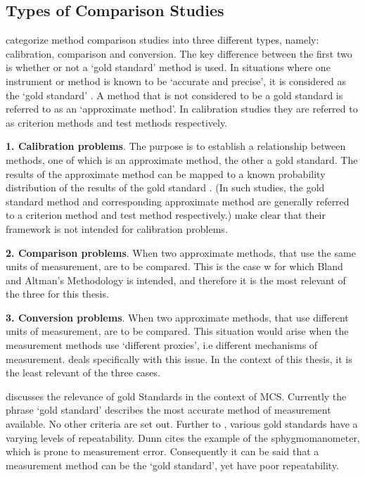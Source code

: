 \documentclass[12pt, a4paper]{report}
\theoremstyle{plain}
\theoremstyle{definition}
\theoremstyle{remark}
\begin{document}
	
	
	
	
	
	
	
	
	
	
	
	\subsection{Types of Comparison Studies}
	\citet{lewis1991} categorize method comparison studies into three
	different types, namely: calibration, comparison and conversion. The key difference between the first two is
	whether or not a `gold standard' method is used. In situations
	where one instrument or method is known to be `accurate and
	precise', it is considered as the `gold standard' \citep{lewis1991}. A
	method that is not considered to be a gold standard is referred to
	as an `approximate method'. In calibration studies they are
	referred to as criterion methods and test methods respectively.
	
	
	\textbf{1. Calibration problems}. The purpose is to establish a
	relationship between methods, one of which is an approximate
	method, the other a gold standard. The results of the approximate
	method can be mapped to a known probability distribution of the
	results of the gold standard \citep{lewis1991}. (In such studies, the
	gold standard method and corresponding approximate method are
	generally referred to a criterion method and test method
	respectively.) \citet*{BA83} make clear that their framework is
	not intended for calibration problems.
	
	\bigskip \textbf{2. Comparison problems}. When two approximate
	methods, that use the same units of measurement, are to be
	compared. This is the case w
	for which Bland and Altman's Methodology is intended, and therefore it is the most relevant of
	the three for this thesis.
	
	\bigskip \textbf{3. Conversion problems}. When two approximate
	methods, that use different units of measurement, are to be
	compared. This situation would arise when the measurement methods
	use `different proxies', i.e different mechanisms of measurement.
	\citet{lewis1991} deals specifically with this issue. In the context
	of this thesis, it is the least relevant of the three cases.
	
		
		
			\citet{ARoy2015} discusses the relevance of gold Standards in the context of MCS.
			Currently the phrase `gold standard' describes the most accurate method of measurement available. No other criteria are set out. Further to \citet{dunnSEME}, various gold standards have a varying levels of repeatability. Dunn cites the example of the sphygmomanometer, which is prone to measurement error. Consequently it can be said that a measurement method can be the `gold standard', yet have poor repeatability. 
		
\end{document}
